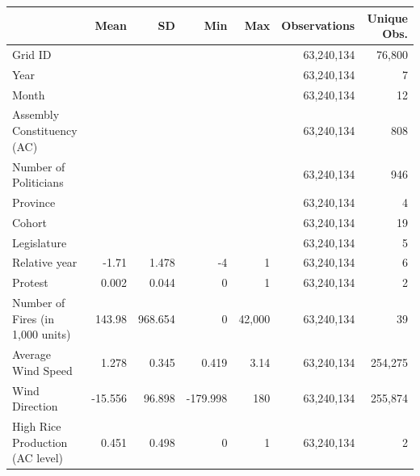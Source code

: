 \begin{tabular}{lrrrrrr}
\toprule
 & Mean & SD & Min & Max & Observations & Unique Obs.\\
\midrule
Grid ID &  &  &  &  & 63,240,134 & 76,800\\
Year &  &  &  &  & 63,240,134 & 7\\
Month &  &  &  &  & 63,240,134 & 12\\
Assembly Constituency (AC) &  &  &  &  & 63,240,134 & 808\\
Number of Politicians &  &  &  &  & 63,240,134 & 946\\
Province &  &  &  &  & 63,240,134 & 4\\
Cohort &  &  &  &  & 63,240,134 & 19\\
Legislature &  &  &  &  & 63,240,134 & 5\\
Relative year & -1.71 & 1.478 & -4 & 1 & 63,240,134 & 6\\
Protest & 0.002 & 0.044 & 0 & 1 & 63,240,134 & 2\\
Number of Fires (in 1,000 units) & 143.98 & 968.654 & 0 & 42,000 & 63,240,134 & 39\\
Average Wind Speed & 1.278 & 0.345 & 0.419 & 3.14 & 63,240,134 & 254,275\\
Wind Direction & -15.556 & 96.898 & -179.998 & 180 & 63,240,134 & 255,874\\
High Rice Production (AC level) & 0.451 & 0.498 & 0 & 1 & 63,240,134 & 2\\
\bottomrule
\end{tabular}
